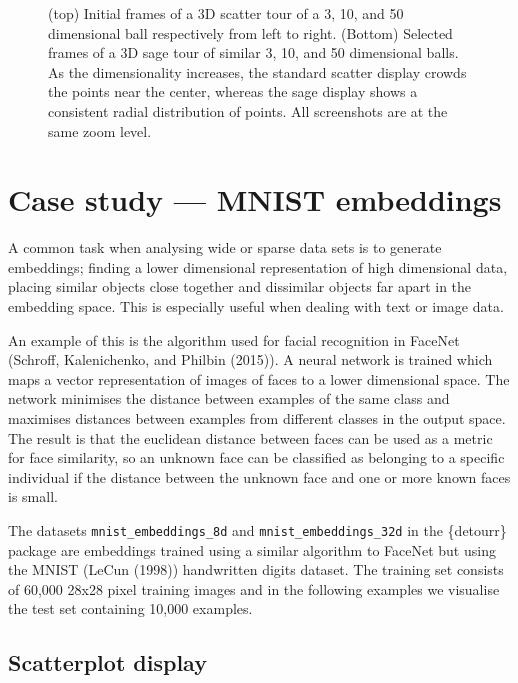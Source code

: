 \begin{figure}
{}

\caption{(top) Initial frames of a 3D scatter tour of a 3, 10, and 50 dimensional ball respectively from left to right. (Bottom) Selected frames of a 3D sage tour of similar 3, 10, and 50 dimensional balls. As the dimensionality increases, the standard scatter display crowds the points near the center, whereas the sage display shows a consistent radial distribution of points. All screenshots are at the same zoom level.}\label{fig:sage-sphere}
\end{figure}

\hypertarget{case-study-mnist-embeddings}{%
\section{Case study --- MNIST embeddings}\label{case-study-mnist-embeddings}}

A common task when analysing wide or sparse data sets is to generate embeddings; finding a lower dimensional representation of high dimensional data, placing similar objects close together and dissimilar objects far apart in the embedding space. This is especially useful when dealing with text or image data.

An example of this is the algorithm used for facial recognition in FaceNet (Schroff, Kalenichenko, and Philbin (2015)). A neural network is trained which maps a vector representation of images of faces to a lower dimensional space. The network minimises the distance between examples of the same class and maximises distances between examples from different classes in the output space. The result is that the euclidean distance between faces can be used as a metric for face similarity, so an unknown face can be classified as belonging to a specific individual if the distance between the unknown face and one or more known faces is small.

The datasets \texttt{mnist\_embeddings\_8d} and \texttt{mnist\_embeddings\_32d} in the \{detourr\} package are embeddings trained using a similar algorithm to FaceNet but using the MNIST (LeCun (1998)) handwritten digits dataset. The training set consists of 60,000 28x28 pixel training images and in the following examples we visualise the test set containing 10,000 examples.

\hypertarget{scatterplot-display}{%
\subsection{Scatterplot display}\label{scatterplot-display}}

